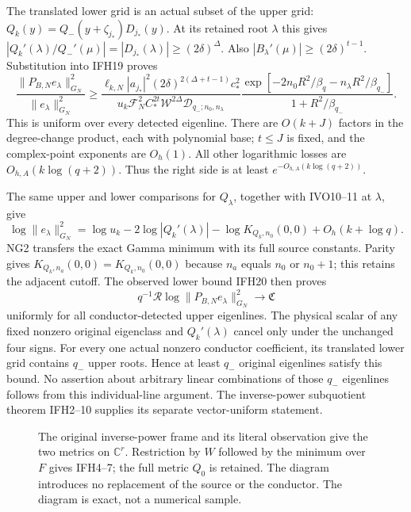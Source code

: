 \documentclass[11pt]{article}
\begin{document}
The translated lower grid is an actual subset of the upper grid:
$Q_k(y)=Q_-(y+\zeta_{j_*})D_{j_*}(y)$.
At its retained root $\lambda$ this gives
$|Q_k'(\lambda)/Q_-'(\mu)|=|D_{j_*}(\lambda)|\ge(2\delta)^\Delta$.
Also $|B_\lambda'(\mu)|\ge(2\delta)^{t-1}$.
Substitution into IFH19 proves
\[
\boxed{\displaystyle
\frac{\|P_{B,N}e_\lambda\|_{G_N}^2}{\|e_\lambda\|_{G_N}^2}
\ge
\frac{\ell_{k,N}|a_{j_*}|^2(2\delta)^{2(\Delta+t-1)}c_*^2}
 {u_k\mathcal F_N^2 C_*^{2t}\mathcal W^{2\Delta}
 \mathcal D_{q_-;n_0,n_\lambda}}
\frac{\exp[-2n_0R^2/\beta_q-n_\lambda R^2/\beta_{q_-}]}
 {1+R^2/\beta_{q_-}} .}
\tag{IFH20}
\]
This is uniform over every detected eigenline.
There are $O(k+J)$ factors in the degree-change product, each with
polynomial base; $t\le J$ is fixed, and the complex-point exponents
are $O_h(1)$. All other logarithmic losses are $O_{h,A}(k\log(q+2))$.
Thus the right side is at least $e^{-O_{h,A}(k\log(q+2))}$.

The same upper and lower comparisons for $Q_\lambda$, together with
IVO10--11 at $\lambda$, give
\[
\log\|e_\lambda\|_{G_N}^2
=\log u_k-2\log|Q_k'(\lambda)|
-\log K_{Q_k,n_0}(0,0)+O_h(k+\log q).
\]
NG2 transfers the exact Gamma minimum with its full source constants.
Parity gives $K_{Q_k,n_a}(0,0)=K_{Q_k,n_0}(0,0)$ because
$n_a$ equals $n_0$ or $n_0+1$; this retains the adjacent cutoff.
The observed lower bound IFH20 then proves
\[
\boxed{\displaystyle
q^{-1}\mathcal R\log\|P_{B,N}e_\lambda\|_{G_N}^2
\longrightarrow\mathfrak C}
\tag{IFH21}
\]
uniformly for all conductor-detected upper eigenlines.
The physical scalar of any fixed nonzero original eigenclass and
$Q_k'(\lambda)$ cancel only under the unchanged four signs.
For every one actual nonzero conductor coefficient, its translated
lower grid contains $q_-$ upper roots. Hence at least $q_-$ original
eigenlines satisfy this bound. No assertion about arbitrary linear
combinations of those $q_-$ eigenlines follows from this
individual-line argument. The inverse-power subquotient theorem
IFH2--10 supplies its separate vector-uniform statement.

\begin{figure}[ht]\centering
{}
\caption{The original inverse-power frame and its literal observation
give the two metrics on $\mathbb C^r$. Restriction by $W$ followed by
the minimum over $F$ gives IFH4--7; the full metric $Q_0$ is retained.
The diagram introduces no replacement of the source or the conductor.
The diagram is exact, not a numerical sample.}
\end{figure}
\end{document}
